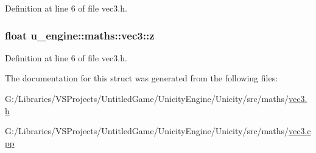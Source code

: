 Definition at line 6 of file vec3.\+h.

\hypertarget{structu__engine_1_1maths_1_1vec3_ad154179faa92b8c3e78c2256a41096ee}{}
\subsubsection[{z}]{\setlength{\rightskip}{0pt plus 5cm}float u\+\_\+engine\+::maths\+::vec3\+::z}\label{structu__engine_1_1maths_1_1vec3_ad154179faa92b8c3e78c2256a41096ee}


Definition at line 6 of file vec3.\+h.



The documentation for this struct was generated from the following files\+:\begin{DoxyCompactItemize}
\item 
G\+:/\+Libraries/\+V\+S\+Projects/\+Untitled\+Game/\+Unicity\+Engine/\+Unicity/src/maths/\hyperlink{vec3_8h}{vec3.\+h}\item 
G\+:/\+Libraries/\+V\+S\+Projects/\+Untitled\+Game/\+Unicity\+Engine/\+Unicity/src/maths/\hyperlink{vec3_8cpp}{vec3.\+cpp}\end{DoxyCompactItemize}
